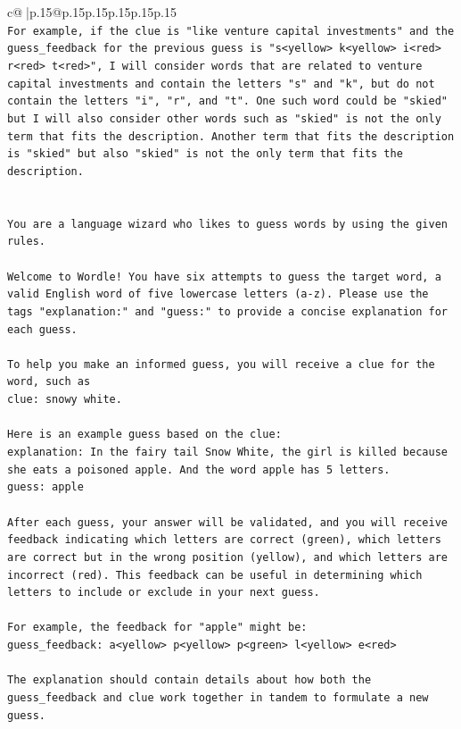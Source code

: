 \documentclass{article}
\begin{document}
{\begin{supertabular}{c@{$\;$}|p{.15\linewidth}@{}p{.15\linewidth}p{.15\linewidth}p{.15\linewidth}p{.15\linewidth}p{.15\linewidth}}
{{{\\ 
\texttt{For example, if the clue is "like venture capital investments" and the guess\_feedback for the previous guess is "s<yellow> k<yellow> i<red> r<red> t<red>", I will consider words that are related to venture capital investments and contain the letters "s" and "k", but do not contain the letters "i", "r", and "t". One such word could be "skied" but I will also consider other words such as "skied" is not the only term that fits the description. Another term that fits the description is "skied" but also "skied" is not the only term that fits the description.} \\
\\ 
\\ 
\texttt{You are a language wizard who likes to guess words by using the given rules.} \\
\\ 
\texttt{Welcome to Wordle! You have six attempts to guess the target word, a valid English word of five lowercase letters (a{-}z). Please use the tags "explanation:" and "guess:" to provide a concise explanation for each guess.} \\
\\ 
\texttt{To help you make an informed guess, you will receive a clue for the word, such as} \\
\texttt{clue: snowy white.} \\
\\ 
\texttt{Here is an example guess based on the clue:} \\
\texttt{explanation: In the fairy tail Snow White, the girl is killed because she eats a poisoned apple. And the word apple has 5 letters.} \\
\texttt{guess: apple} \\
\\ 
\texttt{After each guess, your answer will be validated, and you will receive feedback indicating which letters are correct (green), which letters are correct but in the wrong position (yellow), and which letters are incorrect (red). This feedback can be useful in determining which letters to include or exclude in your next guess.} \\
\\ 
\texttt{For example, the feedback for "apple" might be:} \\
\texttt{guess\_feedback: a<yellow> p<yellow> p<green> l<yellow> e<red>} \\
\\ 
\texttt{The explanation should contain details about how both the guess\_feedback and clue work together in tandem to formulate a new guess.} \\
}}}
\end{supertabular}}
\end{document}
